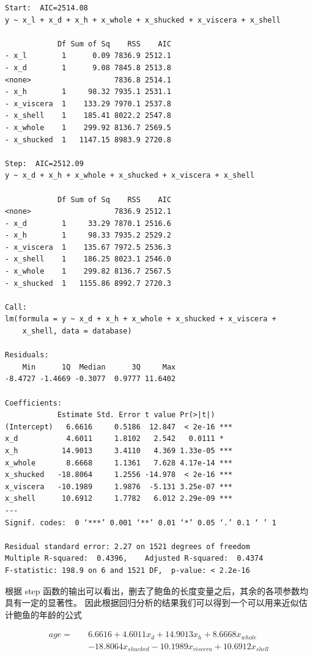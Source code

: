 \documentclass[hyperref,UTF8,12pt,a4paper]{ctexart}
\begin{document}
\begin{verbatim}
Start:  AIC=2514.08
y ~ x_l + x_d + x_h + x_whole + x_shucked + x_viscera + x_shell

            Df Sum of Sq    RSS    AIC
- x_l        1      0.09 7836.9 2512.1
- x_d        1      9.08 7845.8 2513.8
<none>                   7836.8 2514.1
- x_h        1     98.32 7935.1 2531.1
- x_viscera  1    133.29 7970.1 2537.8
- x_shell    1    185.41 8022.2 2547.8
- x_whole    1    299.92 8136.7 2569.5
- x_shucked  1   1147.15 8983.9 2720.8

Step:  AIC=2512.09
y ~ x_d + x_h + x_whole + x_shucked + x_viscera + x_shell

            Df Sum of Sq    RSS    AIC
<none>                   7836.9 2512.1
- x_d        1     33.29 7870.1 2516.6
- x_h        1     98.33 7935.2 2529.2
- x_viscera  1    135.67 7972.5 2536.3
- x_shell    1    186.25 8023.1 2546.0
- x_whole    1    299.82 8136.7 2567.5
- x_shucked  1   1155.86 8992.7 2720.3

Call:
lm(formula = y ~ x_d + x_h + x_whole + x_shucked + x_viscera + 
    x_shell, data = database)

Residuals:
    Min      1Q  Median      3Q     Max 
-8.4727 -1.4669 -0.3077  0.9777 11.6402 

Coefficients:
            Estimate Std. Error t value Pr(>|t|)    
(Intercept)   6.6616     0.5186  12.847  < 2e-16 ***
x_d           4.6011     1.8102   2.542   0.0111 *  
x_h          14.9013     3.4110   4.369 1.33e-05 ***
x_whole       8.6668     1.1361   7.628 4.17e-14 ***
x_shucked   -18.8064     1.2556 -14.978  < 2e-16 ***
x_viscera   -10.1989     1.9876  -5.131 3.25e-07 ***
x_shell      10.6912     1.7782   6.012 2.29e-09 ***
---
Signif. codes:  0 ‘***’ 0.001 ‘**’ 0.01 ‘*’ 0.05 ‘.’ 0.1 ‘ ’ 1

Residual standard error: 2.27 on 1521 degrees of freedom
Multiple R-squared:  0.4396,	Adjusted R-squared:  0.4374 
F-statistic: 198.9 on 6 and 1521 DF,  p-value: < 2.2e-16
\end{verbatim}

根据 step 函数的输出可以看出，删去了鲍鱼的长度变量之后，其余的各项参数均具有一定的显著性。
因此根据回归分析的结果我们可以得到一个可以用来近似估计鲍鱼的年龄的公式

\begin{equation}
  \begin{aligned}
    age =\quad & 6.6616 + 4.6011 x_d + 14.9013 x_h + 8.6668 x_{whole}  \\
    &-18.8064 x_{shucked} -10.1989 x_{viscera} + 10.6912 x_{shell}
  \end{aligned}
\end{equation}
\end{document}
